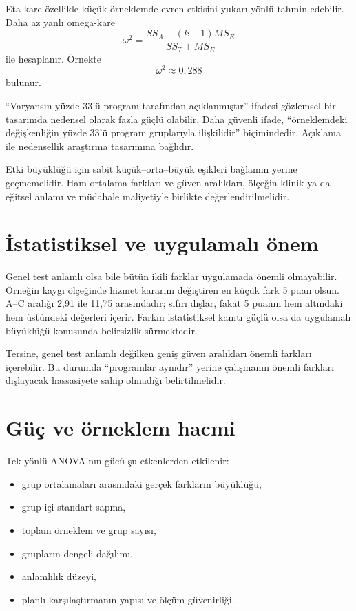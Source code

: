 Eta-kare özellikle küçük örneklemde evren etkisini yukarı yönlü tahmin
edebilir. Daha az yanlı omega-kare
\[
\omega^2=
\frac{SS_A-(k-1)MS_E}{SS_T+MS_E}
\]
ile hesaplanır. Örnekte
\[
\omega^2\approx0{,}288
\]
bulunur.

\begin{researchbox}
``Varyansın yüzde 33'ü program tarafından açıklanmıştır'' ifadesi gözlemsel
bir tasarımda nedensel olarak fazla güçlü olabilir. Daha güvenli ifade,
``örneklemdeki değişkenliğin yüzde 33'ü program gruplarıyla ilişkilidir''
biçimindedir. Açıklama ile nedensellik araştırma tasarımına bağlıdır.
\end{researchbox}

Etki büyüklüğü için sabit küçük--orta--büyük eşikleri bağlamın yerine
geçmemelidir. Ham ortalama farkları ve güven aralıkları, ölçeğin klinik ya da
eğitsel anlamı ve müdahale maliyetiyle birlikte değerlendirilmelidir.

\section{İstatistiksel ve uygulamalı önem}

Genel test anlamlı olsa bile bütün ikili farklar uygulamada önemli olmayabilir.
Örneğin kaygı ölçeğinde hizmet kararını değiştiren en küçük fark 5 puan olsun.
A--C aralığı 2,91 ile 11,75 arasındadır; sıfırı dışlar, fakat 5 puanın hem
altındaki hem üstündeki değerleri içerir. Farkın istatistiksel kanıtı güçlü
olsa da uygulamalı büyüklüğü konusunda belirsizlik sürmektedir.

Tersine, genel test anlamlı değilken geniş güven aralıkları önemli farkları
içerebilir. Bu durumda ``programlar aynıdır'' yerine çalışmanın önemli
farkları dışlayacak hassasiyete sahip olmadığı belirtilmelidir.

\section{Güç ve örneklem hacmi}

Tek yönlü ANOVA'nın gücü şu etkenlerden etkilenir:

\begin{itemize}
  \item grup ortalamaları arasındaki gerçek farkların büyüklüğü,
  \item grup içi standart sapma,
  \item toplam örneklem ve grup sayısı,
  \item grupların dengeli dağılımı,
  \item anlamlılık düzeyi,
  \item planlı karşılaştırmanın yapısı ve ölçüm güvenirliği.
\end{itemize}

